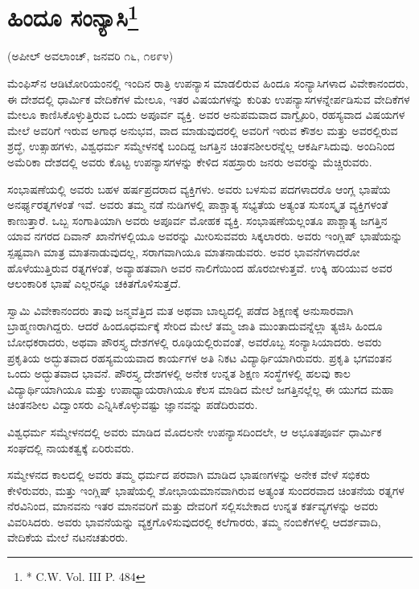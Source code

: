 \delimiter


\section[ಹಿಂದೂ ಸಂನ್ಯಾಸಿ]{ಹಿಂದೂ ಸಂನ್ಯಾಸಿ\protect\footnote{* C.W. Vol. III P. 484}}

\begin{center}
(ಅಪೀಲ್​ ಅವಲಾಂಚ್​, ಜನವರಿ ೧೬, ೧೮೯೪)
\end{center}

ಮೆಂಫಿಸ್​ನ ಆಡಿಟೋರಿಯಂನಲ್ಲಿ ಇಂದಿನ ರಾತ್ರಿ ಉಪನ್ಯಾಸ ಮಾಡಲಿರುವ ಹಿಂದೂ ಸಂನ್ಯಾಸಿಗಳಾದ ವಿವೇಕಾನಂದರು, ಈ ದೇಶದಲ್ಲಿ ಧಾರ್ಮಿಕ ವೇದಿಕೆಗಳ ಮೇಲೂ, ಇತರ ವಿಷಯಗಳನ್ನು ಕುರಿತು ಉಪನ್ಯಾಸಗಳನ್ನೇರ್ಪಡಿಸುವ ವೇದಿಕೆಗಳ ಮೇಲೂ ಕಾಣಿಸಿಕೊಳ್ಳುತ್ತಿರುವ ಒಂದು ಅಪೂರ್ವ ವ್ಯಕ್ತಿ. ಅವರ ಅನುಪಮವಾದ ವಾಗ್ವೈಖರಿ, ರಹಸ್ಯವಾದ ವಿಷಯಗಳ ಮೇಲೆ ಅವರಿಗೆ ಇರುವ ಅಗಾಧ ಅನುಭವ, ವಾದ ಮಾಡುವುದರಲ್ಲಿ ಅವರಿಗೆ ಇರುವ ಕೌಶಲ ಮತ್ತು ಅವರಲ್ಲಿರುವ ಶ್ರದ್ಧೆ, ಉತ್ಸಾಹಗಳು, ವಿಶ್ವಧರ್ಮ ಸಮ್ಮೇಳನಕ್ಕೆ ಬಂದಿದ್ದ ಜಗತ್ತಿನ ಚಿಂತನಶೀಲರನ್ನೆಲ್ಲ ಆಕರ್ಷಿಸಿದುವು. ಅಂದಿನಿಂದ ಅಮೆರಿಕಾ ದೇಶದಲ್ಲಿ ಅವರು ಕೊಟ್ಟ ಉಪನ್ಯಾಸಗಳನ್ನು ಕೇಳಿದ ಸಹಸ್ರಾರು ಜನರು ಅವರನ್ನು ಮೆಚ್ಚಿರುವರು.

ಸಂಭಾಷಣೆಯಲ್ಲಿ ಅವರು ಬಹಳ ಹರ್ಷಪ್ರದರಾದ ವ್ಯಕ್ತಿಗಳು. ಅವರು ಬಳಸುವ ಪದಗಳಾದರೊ ಆಂಗ್ಲ ಭಾಷೆಯ ಅನರ್ಘ್ಯರತ್ನಗಳಂತೆ ಇವೆ. ಅವರು ತಮ್ಮ ನಡೆ ನುಡಿಗಳಲ್ಲಿ ಪಾಶ್ಚಾತ್ಯ ಸಭ್ಯತೆಯ ಅತ್ಯಂತ ಸುಸಂಸ್ಕೃತ ವ್ಯಕ್ತಿಗಳಂತೆ ಕಾಣುತ್ತಾರೆ. ಒಬ್ಬ ಸಂಗಾತಿಯಾಗಿ ಅವರು ಅಪೂರ್ವ ಮೋಹಕ ವ್ಯಕ್ತಿ. ಸಂಭಾಷಣೆಯಲ್ಲಂತೂ ಪಾಶ್ಚಾತ್ಯ ಜಗತ್ತಿನ ಯಾವ ನಗರದ ದಿವಾನ್​ ಖಾನೆಗಳಲ್ಲಿಯೂ ಅವರನ್ನು ಮೀರಿಸುವವರು ಸಿಕ್ಕಲಾರರು. ಅವರು ಇಂಗ್ಲಿಷ್​ ಭಾಷೆಯನ್ನು ಸ್ಪಷ್ಟವಾಗಿ ಮಾತ್ರ ಮಾತನಾಡುವುದಲ್ಲ, ಸರಾಗವಾಗಿಯೂ ಮಾತನಾಡುವರು. ಅವರ ಭಾವನೆಗಳಾದರೋ ಹೊಳೆಯುತ್ತಿರುವ ರತ್ನಗಳಂತೆ, ಅವ್ಯಾಹತವಾಗಿ ಅವರ ನಾಲಿಗೆಯಿಂದ ಹೊರಬೀಳುತ್ತವೆ. ಉಕ್ಕಿ ಹರಿಯುವ ಅವರ ಆಲಂಕಾರಿಕ ಭಾಷೆ ಎಲ್ಲರನ್ನೂ ಚಕಿತಗೊಳಿಸುತ್ತದೆ.

ಸ್ವಾಮಿ ವಿವೇಕಾನಂದರು ತಾವು ಜನ್ಮವೆತ್ತಿದ ಮತ ಅಥವಾ ಬಾಲ್ಯದಲ್ಲಿ ಪಡೆದ ಶಿಕ್ಷಣಕ್ಕೆ ಅನುಸಾರವಾಗಿ ಬ್ರಾಹ್ಮಣರಾಗಿದ್ದರು. ಆದರೆ ಹಿಂದೂಧರ್ಮಕ್ಕೆ ಸೇರಿದ ಮೇಲೆ ತಮ್ಮ ಜಾತಿ ಮುಂತಾದುವನ್ನೆಲ್ಲಾ ತ್ಯಜಿಸಿ ಹಿಂದೂ ಬೋಧಕರಾದರು, ಅಥವಾ ಪೌರಸ್ತ್ಯ ದೇಶಗಳಲ್ಲಿ ರೂಢಿಯಲ್ಲಿರುವಂತೆ, ಅವರೊಬ್ಬ ಸಂನ್ಯಾಸಿಯಾದರು. ಅವರು ಪ್ರಕೃತಿಯ ಅದ್ಭುತವಾದ ರಹಸ್ಯಮಯವಾದ ಕಾರ್ಯಗಳ ಅತಿ ನಿಕಟ ವಿದ್ಯಾರ್ಥಿಯಾಗಿರುವರು. ಪ್ರಕೃತಿ ಭಗವಂತನ ಒಂದು ಅದ್ಭುತವಾದ ಭಾವನೆ. ಪೌರಸ್ತ್ಯ ದೇಶಗಳಲ್ಲಿ ಅನೇಕ ಉನ್ನತ ಶಿಕ್ಷಣ ಸಂಸ್ಥೆಗಳಲ್ಲಿ ಹಲವು ಕಾಲ ವಿದ್ಯಾರ್ಥಿಯಾಗಿಯೂ ಮತ್ತು ಉಪಾಧ್ಯಾಯರಾಗಿಯೂ ಕೆಲಸ ಮಾಡಿದ ಮೇಲೆ ಜಗತ್ತಿನಲ್ಲೆಲ್ಲ ಈ ಯುಗದ ಮಹಾ ಚಿಂತನಶೀಲ ವಿದ್ವಾಂಸರು ಎನ್ನಿಸಿಕೊಳ್ಳುವಷ್ಟು ಜ್ಞಾನವನ್ನು ಪಡೆದಿರುವರು.

ವಿಶ್ವಧರ್ಮ ಸಮ್ಮೇಳನದಲ್ಲಿ ಅವರು ಮಾಡಿದ ಮೊದಲನೇ ಉಪನ್ಯಾಸದಿಂದಲೇ, ಆ ಅಭೂತಪೂರ್ವ ಧಾರ್ಮಿಕ ಸಂಘದಲ್ಲಿ ನಾಯಕತ್ವಕ್ಕೆ ಏರಿರುವರು.

ಸಮ್ಮೇಳನದ ಕಾಲದಲ್ಲಿ ಅವರು ತಮ್ಮ ಧರ್ಮದ ಪರವಾಗಿ ಮಾಡಿದ ಭಾಷಣಗಳನ್ನು ಅನೇಕ ವೇಳೆ ಸಭಿಕರು ಕೇಳಿರುವರು, ಮತ್ತು ಇಂಗ್ಲಿಷ್​ ಭಾಷೆಯಲ್ಲಿ ಶೋಭಾಯಮಾನವಾಗಿರುವ ಅತ್ಯಂತ ಸುಂದರವಾದ ಚಿಂತನೆಯ ರತ್ನಗಳ ನೆರವಿನಿಂದ, ಮಾನವನು ಇತರ ಮಾನವರಿಗೆ ಮತ್ತು ದೇವರಿಗೆ ಸಲ್ಲಿಸಬೇಕಾದ ಉನ್ನತ ಕರ್ತವ್ಯಗಳನ್ನು ಅವರು ವಿವರಿಸಿದರು. ಅವರು ಭಾವನೆಯನ್ನು ವ್ಯಕ್ತಗೊಳಿಸುವುದರಲ್ಲಿ ಕಲೆಗಾರರು, ತಮ್ಮ ನಂಬಿಕೆಗಳಲ್ಲಿ ಆದರ್ಶವಾದಿ, ವೇದಿಕೆಯ ಮೇಲೆ ನಟನಚತುರರು.

